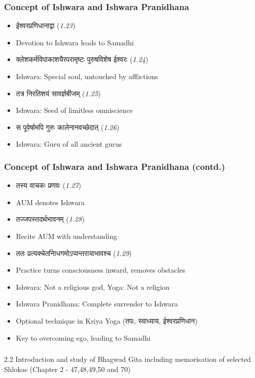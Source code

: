 \begin{frame}[fragile]\frametitle{Concept of Ishwara and Ishwara Pranidhana}
    \begin{itemize}
        \item ईश्वरप्रणिधानाद्वा (\textit{1.23})
        \item Devotion to Ishwara leads to Samadhi
        \item क्लेशकर्मविपाकाशयैरपरामृष्टः पुरुषविशेष ईश्वरः (\textit{1.24})
        \item Ishwara: Special soul, untouched by afflictions
        \item तत्र निरतिशयं सावर्ज्ञबीजम् (\textit{1.25})
        \item Ishwara: Seed of limitless omniscience
        \item स पूवेर्षामपि गुरुः कालेनानवच्छेदात् (\textit{1.26})
        \item Ishwara: Guru of all ancient gurus
    \end{itemize}
\end{frame}

\begin{frame}[fragile]\frametitle{Concept of Ishwara and Ishwara Pranidhana (contd.)}
    \begin{itemize}
        \item तस्य वाचकः प्रणवः (\textit{1.27})
        \item AUM denotes Ishwara
        \item तज्जपस्तदर्थभावनम् (\textit{1.28})
        \item Recite AUM with understanding
        \item ततः प्रत्यक्चेतनािधगमोऽप्यन्तरायाभावश्च (\textit{1.29})
        \item Practice turns consciousness inward, removes obstacles
        \item Ishwara: Not a religious god, Yoga: Not a religion
        \item Ishwara Pranidhana: Complete surrender to Ishwara
        \item Optional technique in Kriya Yoga (तपः, स्वाध्याय, ईश्वरप्रणिधान)
        \item Key to overcoming ego, leading to Samadhi
    \end{itemize}
\end{frame}

\begin{frame}[fragile]\frametitle{}
\begin{center}
{\Large 2.2 Introduction and study of Bhagwad Gita including memorisation of selected Shlokas (Chapter 2 - 47,48,49,50 and 70)}
\end{center}
\end{frame}

